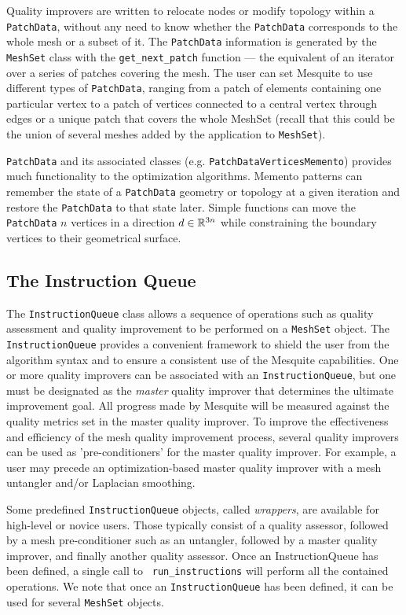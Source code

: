 \documentclass[psfig]{article}
\begin{document}
Quality improvers are written to relocate nodes or modify topology
within a \texttt{PatchData}, without any need to know whether the
\texttt{PatchData} corresponds to the whole mesh or a subset of
it. The \texttt{PatchData} information is generated by the
\texttt{MeshSet} class with the \texttt{get\_next\_patch} function ---
the equivalent of an iterator over a series of patches covering the
mesh.  The user can set Mesquite to use different types of
\texttt{PatchData}, ranging from a patch of elements containing one
particular vertex to a patch of vertices connected to a central vertex
through edges or a unique patch that covers the whole MeshSet
(recall that this could be the union of several meshes added by the
application to \texttt{MeshSet}).

\texttt{PatchData} and its associated classes
(e.g. \texttt{PatchDataVerticesMemento}) provides much functionality
to the optimization algorithms.  Memento patterns can remember the
state of a \texttt{PatchData} geometry or topology at a given
iteration and restore the \texttt{PatchData} to that state
later. Simple functions can move the \texttt{PatchData} $n$ vertices
in a direction $d \in \Bbb{R}^{3n}$ while constraining the boundary
vertices to their geometrical surface.

\subsection{The Instruction Queue} \label{sec:IQ}

The \texttt{InstructionQueue} class allows a sequence of operations
such as quality assessment and quality improvement to be performed on
a \texttt{MeshSet} object. The {\tt
InstructionQueue} provides a convenient framework to shield the user
from the algorithm syntax and to ensure a consistent use of the
Mesquite capabilities.  One or more quality improvers can be
associated with an {\tt InstructionQueue}, but one must be designated
as the {\it master} quality improver that determines the ultimate 
improvement goal.  All progress made by Mesquite will be
measured against the quality metrics set in the master quality
improver.  To improve the effectiveness and efficiency of the mesh
quality improvement process, several quality improvers can be used as
'pre-conditioners' for the master quality improver.  For example, a
user may precede an optimization-based master quality improver with a
mesh untangler and/or Laplacian smoothing.

Some predefined {\tt InstructionQueue} objects, called \emph
{wrappers}, are available for high-level or novice users. Those
typically consist of a quality assessor, followed by a mesh
pre-conditioner such as an untangler, followed by a master quality
improver, and finally another quality assessor.  Once an
InstructionQueue has been defined, a single call to {\tt
run\_instructions} will perform all the contained operations.  We note
that once an {\tt InstructionQueue} has been defined, it can be used
for several \texttt{MeshSet} objects.
\end{document}
